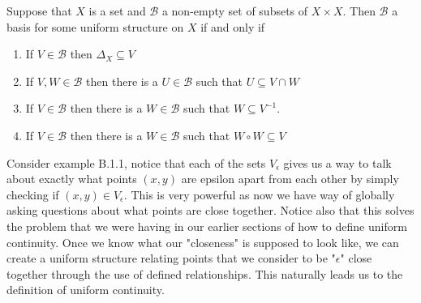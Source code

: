 \begin{defn}
  Suppose that $X$ is a set and $\mathcal{B}$ a non-empty set of subsets of $X
  \times X$. Then $\mathcal{B}$ a basis for some uniform structure on $X$ if
  and only if
  \begin{enumerate}
    \item If $V \in \mathcal{B}$ then $\Delta_{X} \subseteq V$ 
    \item If $V, W \in \mathcal{B}$ then there is a $U \in \mathcal{B}$ such
      that $U \subseteq V \cap W$
    \item If $V \in \mathcal{B}$ then there is a $W \in \mathcal{B}$ such that
      $W \subseteq V^{-1}$.
    \item If $V \in \mathcal{B}$ then there is a $W \in \mathcal{B}$ such that
      $W \circ W \subseteq V$
  \end{enumerate}
\end{defn}
Consider example B.1.1, notice that each of the sets $V_{\epsilon}$ gives us a way 
to talk about exactly what points $(x,y)$ are epsilon apart from each other by 
simply checking if $(x, y) \in V_{\epsilon}$. This is very powerful as now we have  
way of globally asking questions about what points are close together. Notice 
also that this solves the problem that we were having in our earlier sections of 
how to define uniform continuity. Once we know what our "closeness" is supposed 
to look like, we can create a uniform structure relating points that we consider 
to be "$\epsilon$" close together through the use of defined relationships. This 
naturally leads us to the definition of uniform continuity.

